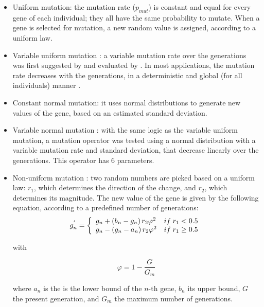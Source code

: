 \documentclass{ametsoc}
\begin{document}
\begin{itemize}
	\item Uniform mutation: the mutation rate ($p_{mut}$) is constant and equal for every gene of each individual; they all have the same probability to mutate. When a gene is selected for mutation, a new random value is assigned, according to a uniform law.
	
	\item Variable uniform mutation \citep{Fogarty1989}: a variable mutation rate over the generations was first suggested by \citet{Holland1992b} and evaluated by \citet{Fogarty1989}. In most applications, the mutation rate decreases with the generations, in a deterministic and global (for all individuals) manner \citep{Back1992b}. 
	
	\item Constant normal mutation: it uses normal distributions to generate new values of the gene, based on an estimated standard deviation.
	
	\item Variable normal mutation \citep{Horton2012a}: with the same logic as the variable uniform mutation, a mutation operator was tested using a normal distribution with a variable mutation rate and standard deviation, that decrease linearly over the generations. This operator has 6 parameters.
	
	\item Non-uniform mutation \citep{Michalewicz1996}: two random numbers are picked based on a uniform law: $r_{1}$, which determines the direction of the change, and $r_{2}$, which determines its magnitude. The new value of the gene is given by the following equation, according to a predefined number of generations:
	\begin{equation}
	g_{n}^{'} = 
	\left\lbrace \begin{array}{l l} 
	g_{n} + \left(b_{n}-g_{n}\right) r_{2} \varphi^{2} & if \; r_{1} < 0.5 \\
	g_{n} - \left(g_{n}-a_{n}\right) r_{2} \varphi^{2} & if \; r_{1} \geq 0.5 \\
	\end{array} \right.
	\label{equation_mutation_nonuniform_original}
	\end{equation}
	
	with 
	
	\begin{equation}
	\varphi = 1 - \dfrac{G}{G_{m}}
	\end{equation}
	
	where $a_{n}$ is the is the lower bound of the $n$-th gene, $b_{n}$ its upper bound, $G$ the present generation, and $G_{m}$ the maximum number of generations.
	

\end{itemize}
\end{document}
